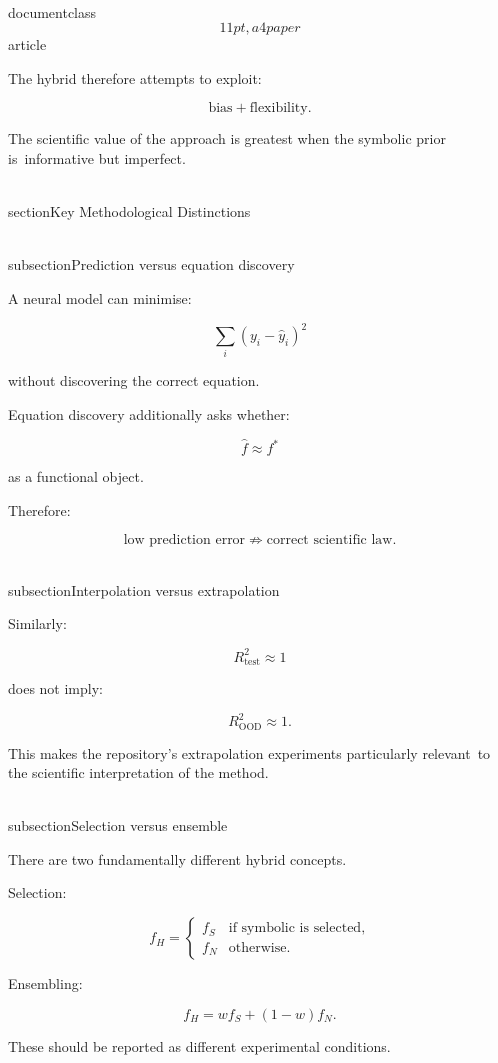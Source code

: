 \\documentclass\[11pt,a4paper\]{article}
\begin{document}
 The hybrid therefore attempts to exploit:

 $$
\text{bias}
+
\text{flexibility}.
$$

 The scientific value of the approach is greatest when the symbolic prior is\
 informative but imperfect.

 \\section{Key Methodological Distinctions}\

 \\subsection{Prediction versus equation discovery}

 A neural model can minimise:

 $$
\sum_i
(y_i-\hat y_i)^2
$$

 without discovering the correct equation.

 Equation discovery additionally asks whether:

 $$
\hat f
\approx
f^*
$$

 as a functional object.

 Therefore:

 $$
\text{low prediction error}
\not\Rightarrow
\text{correct scientific law}.
$$

 \\subsection{Interpolation versus extrapolation}

 Similarly:

 $$
R^2_{\mathrm{test}}\approx1
$$

 does not imply:

 $$
R^2_{\mathrm{OOD}}\approx1.
$$

 This makes the repository's extrapolation experiments particularly relevant\
 to the scientific interpretation of the method.

 \\subsection{Selection versus ensemble}

 There are two fundamentally different hybrid concepts.

 Selection:

 $$
f_H=
\begin{cases}
f_S & \text{if symbolic is selected},\\
f_N & \text{otherwise}.
\end{cases}
$$

 Ensembling:

 $$
f_H=
wf_S+(1-w)f_N.
$$

 These should be reported as different experimental conditions.
\end{document}

